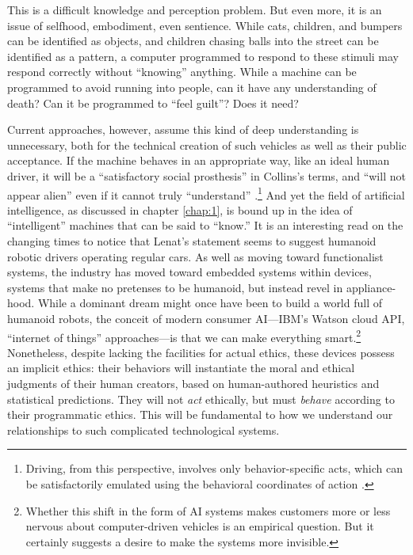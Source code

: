 This is a difficult knowledge and perception problem. But even more,
it is an issue of selfhood, embodiment, even sentience. While cats,
children, and bumpers can be identified as objects, and children
chasing balls into the street can be identified as a pattern, a
computer programmed to respond to these stimuli may respond correctly
without ``knowing'' anything. While a machine can be programmed to avoid
running into people, can it have any understanding of death? Can it be
programmed to ``feel guilt''? Does it need?





Current approaches, however, assume this kind of deep understanding is
unnecessary, both for the technical creation of such vehicles as well
as their public acceptance. If the machine behaves in an appropriate
way, like an ideal human driver, it will be a ``satisfactory social
prosthesis'' in Collins's terms, and ``will not appear alien'' even if
it cannot truly ``understand'' \cite[p. 31]{Collins}.\footnote{Driving, from
this perspective, involves only behavior-specific acts, which can be
satisfactorily emulated using the behavioral coordinates of
action \cite[p. 33--37]{Collins}.} And yet the field of artificial
intelligence, as discussed in chapter \ref{chap:1}, is bound up in the idea 
of ``intelligent'' machines that can be said to ``know.'' It is an
interesting read on the changing 
times to notice that Lenat's statement seems to suggest humanoid
robotic drivers operating regular cars. As well as moving toward
functionalist systems, the industry has moved toward embedded systems
within devices, systems that make no pretenses to be humanoid, but
instead revel in appliance-hood. While a dominant dream might once have been
to build a world full of humanoid robots, the conceit of modern
consumer AI---IBM's Watson cloud API, ``internet of things''
approaches---is that we can make everything smart.\footnote{Whether this shift
in the form of AI 
systems makes customers more or less nervous about computer-driven
vehicles is an empirical question. But it certainly suggests a desire
to make the systems more 
invisible.}
Nonetheless, despite lacking the facilities for actual ethics, these
devices possess an implicit ethics: their
behaviors will instantiate the moral and
ethical judgments of their human creators, based on
human-authored heuristics and statistical predictions. They will not
\emph{act} ethically, but must
\emph{behave} according to their programmatic ethics. This will be
fundamental to how we understand our relationships to such
complicated technological systems.

